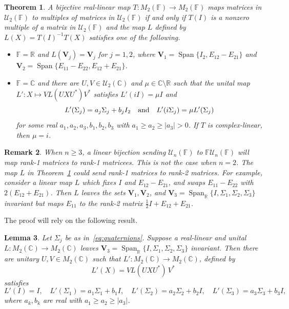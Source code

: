 \documentclass[11pt]{article}
\newtheorem{theorem}{Theorem}[section]
\newtheorem{lemma}[theorem]{Lemma}
\newtheorem{remark}[theorem]{Remark}
\numberwithin{equation}{section}
\def\IF{{\mathbb F}}
\def\IC{{\mathbb C}}
\def\IR{{\mathbb R}}
\def\bV{{\mathbf V}}
\def\span{{\mathop{\mathrm{Span}}\nolimits}}
\def\bV{{\mathbf V}}
\begin{document}
\begin{theorem}\label{P:unitary}
A bijective real-linear map $T\colon  M_2(\IF) \rightarrow M_2(\IF)$
maps matrices in ${\mathcal U}_2(\IF)$ to multiples of matrices in ${\mathcal U}_2(\IF)$ if and only if $T(I)$ is a nonzero multiple of a  matrix  in ${\mathcal U}_2(\IF)$ and the map $L$ defined by $L(X) = T(I)^{-1} T(X)$ satisfies one of the following.
\begin{itemize}
\item[{\rm (i)}] $\IF = \IR$ and $L(\bV_j) = \bV_j$ for $j = 1,2$, where
$\bV_1 = \span\{I_2, E_{12}-E_{21}\}$ and $\bV_2 = \span\{E_{11}-E_{22}, E_{12} + E_{21}\}$.
\item[{\rm (ii)}] $\IF=\IC$ and there are $U,V\in {\mathcal U}_2(\IC)$ and $\mu\in\IC\setminus\IR$ such that the unital map $L'\colon X \mapsto
 VL(UXU^\ast)V^\ast$ satisfies $L'(i I)=\mu I$ and
               $$L'(\Sigma_j) = a_j \Sigma_j +  b_j I_2\quad \hbox{and}\quad L'(i\Sigma_j)=\mu L'(\Sigma_j)$$     for some
real $a_1, a_2, a_3, b_1, b_2, b_3$ with  $a_1\ge a_2\ge| a_3|>0$. If $T$ is complex-linear, then $\mu=i$.
\end{itemize}
\end{theorem}

\begin{remark}
When $n \ge 3$, a linear bijection sending ${\mathcal U}_n(\IF)$ to
$\IF {\mathcal U}_n(\IF)$ will map rank-1 matrices to rank-1 matricees. This is not the case when $n = 2$.
The map $L$  in Theorem~\ref{P:unitary}
 could send rank-1 matrices to rank-2 matrices.  For example, consider a linear map  $L$ which fixes $I$ and $E_{12}-E_{21}$, and swaps $E_{11}-E_{22}$ with $2(E_{12}+E_{21})$. Then $L$ leaves the sets $\bV_1,\bV_2$, and $\bV_3=\span_{\IR}\{I,\Sigma_1,\Sigma_2,\Sigma_3\}$ invariant   but maps $E_{11}$ to the rank-2 matrix $\frac{1}{2}I + E_{12}+E_{21}$.
\end{remark}


The  proof  will rely on the following result.
\begin{lemma}\label{lem:reduction-2-by-2}
Let $\Sigma_j$ be as in~\eqref{eq:quaternions}. Suppose a real-linear and unital $L\colon M_2(\IC)\to M_2(\IC)$  leaves $\bV_3=\span_{\IR}\{I,\Sigma_1,\Sigma_2,\Sigma_3\}$ invariant. Then there are
unitary $U, V \in M_2(\IC)$ such that $L'\colon M_2(\IC)\to M_2(\IC)$, defined by
\[
L'(X) = V L(U X U^*)\,V^*
\]
satisfies
\[
L'(I) = I,\quad L'(\Sigma_{1}) = a_1 \Sigma_1 + b_1 I,\quad L'(\Sigma_{2}) = a_2 \Sigma_2 +  b_2I,\quad L'(\Sigma_3) = a_3 \Sigma_3 + b_3 I,
\]
where $a_k,b_k$ are real with $a_1\ge a_2\ge |a_3|$.
\end{lemma}
\end{document}
